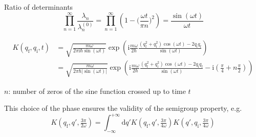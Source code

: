 \documentclass[t,dvipsnames]{beamer}
\begin{document}
\begin{frame}[c]{Ratio of determinants}
 \begin{displaymath}
  \prod_{n=1}^\infty\frac{\lambda_n}{\lambda_n^{(0)}}
     = \prod_{n=1}^\infty\left(1-\big(\frac{\omega t}{\pi n}\big)^2\right)
     = \frac{\sin(\omega t)}{\omega t}
 \end{displaymath}

 \vspace{0.3truecm}
 \begin{footnotesize}
  \begin{displaymath}
   \begin{aligned}
     K(q_\text{f}, q_\text{i}, t) &= \sqrt{\frac{m\omega}{2\pi\text{i}\hbar\sin(\omega t)}}
         \exp\left(\text{i}\frac{m\omega}{2\hbar}\frac{(q_\text{f}^2+q_\text{i}^2)\cos(\omega t)
		      -2q_\text{i}q_\text{f}}{\sin(\omega t)}\right)\\
      &= \sqrt{\frac{m\omega}{2\pi\hbar\vert{\sin(\omega t)}\vert}}
         \exp\left(\text{i}\frac{m\omega}{2\hbar}\frac{(q_\text{f}^2+q_\text{i}^2)\cos(\omega t)
         -2q_\text{i}q_\text{f}}{\sin(\omega t)}-\text{i}\left(\frac{\pi}{4}+n\frac{\pi}{2}\right)\right)
   \end{aligned}
  \end{displaymath}

  $n$: number of zeros of the sine function crossed up to time $t$
 \end{footnotesize}

 \vspace{0.3truecm}
 This choice of the phase ensures the validity of the semigroup property, e.g.
 \begin{displaymath}
  K(q_\text{f}, q', \tfrac{3\pi}{2\omega}) = \int_{-\infty}^{+\infty}\text{d}q'
	     K(q_\text{f}, q', \tfrac{3\pi}{4\omega})K(q', q_\text{i}, \tfrac{3\pi}{4\omega})
 \end{displaymath}
\end{frame}
\end{document}
